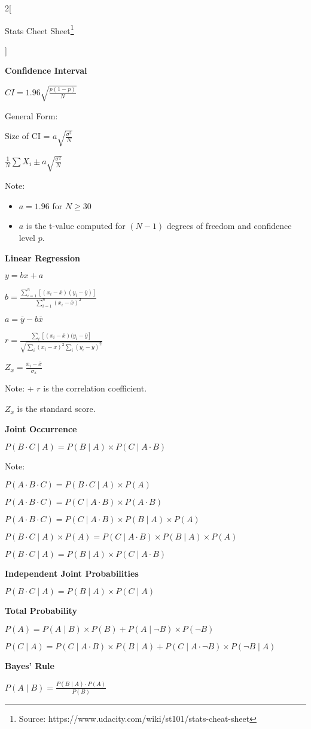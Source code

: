 \documentclass[9pt]{article}
\newcommand{\mytitle}{Stats Cheet Sheet}
\begin{document}
\begin{multicols}{2}[
	\begin{center}
		\mytitle \footnote{Source: https://www.udacity.com/wiki/st101/stats-cheat-sheet}
	\end{center}]
	
	\textbf{Confidence Interval}
	
	$CI=1.96\sqrt{\frac{p(1-p)}{N}}$
	
	General Form:
	
	Size of CI = $a\sqrt{\frac{\sigma^2}{N}}$
	
	$\frac{1}{N}\sum X_i\pm a\sqrt{\frac{\sigma^2}{N}}$
	
	Note:
	\begin{itemize}
	    \item $a=1.96$ for $N\ge30$
	    \item $a$ is the t-value computed for $(N-1)$ degrees of freedom and confidence level $p$.
	\end{itemize}

\columnbreak
	
	\textbf{Linear Regression}
	
	$y=bx+a$
	
	$b=\frac{\sum_{i=1}^n[(x_i-\overline{x})(y_i-\overline{y})]}{\sum_{i=1}^n(x_i-\overline{x})^2}$
	
	$a=\overline{y}-b\overline{x}$
	
	$r=\frac{\sum_i[(x_i-\overline{x})(y_i-\overline{y}]}{\sqrt{\sum_i(x_i-\overline{x})^2\sum_i(y_i-\overline{y})^2}}$
	
	$Z_x=\frac{x_i-\overline{x}}{\sigma_x}$
	
	Note: + $r$ is the correlation coefficient.
	
	 $Z_x$ is the standard score.


	\textbf{Joint Occurrence}
	
	$P(B\cdot C\mid A)=P(B\mid A)\times P(C\mid A\cdot B)$
	
	Note:
	
	$P(A\cdot B\cdot C)=P(B\cdot C\mid A)\times P(A)$
	
	$P(A\cdot B\cdot C)=P(C\mid A\cdot B)\times P(A\cdot B)$
	
	$P(A\cdot B\cdot C)=P(C\mid A\cdot B)\times P(B\mid A)\times P(A)$
	
	$P(B\cdot C\mid A)\times P(A)=P(C\mid A\cdot B)\times P(B\mid A)\times P(A)$
	
	$P(B\cdot C\mid A)=P(B\mid A)\times P(C\mid A\cdot B)$
	
	
	\textbf{Independent Joint Probabilities}
	
	$P(B\cdot C\mid A)=P(B\mid A)\times P(C\mid A)$
	
	
	\textbf{Total Probability}
	
	$P(A)=P(A\mid B)\times P(B)+P(A\mid\neg B)\times P(\neg B)$
	
	$P(C\mid A)=P(C\mid A\cdot B)\times P(B\mid A)+P(C\mid A\cdot\neg B)\times P(\neg B\mid A)$
	
	
	\textbf{Bayes' Rule}
	
	$P(A\mid B)=\frac{P(B\mid A)\cdot P(A)}{P(B)}$
	
\end{multicols}
\end{document}
